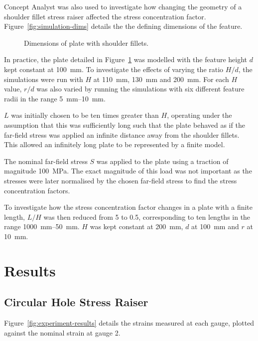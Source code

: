 \documentclass[a4paper,11pt,twocolumn]{article}
\newcommand{\MPa}{\si{\mega\pascal}\xspace}
\newcommand{\mm}{\si{\milli\meter}\xspace}
\begin{document}
Concept Analyst was also used to investigate how changing the geometry of a 
shoulder fillet stress raiser affected the stress concentration factor. 
Figure~\vref{fig:simulation-dims} details the the defining dimensions of the 
feature.

\begin{figure}[h]
    \centering
    \def\svgwidth{\linewidth}
    
    \caption{Dimensions of plate with shoulder fillets.}
    \label{fig:simulation-dims}
\end{figure}

In practice, the plate detailed in Figure~\ref{fig:simulation-dims} was modelled
with the feature height $d$ kept constant at 100~\mm. To investigate the effects
of varying the ratio $H/d$, the simulations were run with $H$ at 110~\mm,
130~\mm and 200~\mm. For each $H$ value, $r/d$ was also varied by running the
simulations with six different feature radii in the range 5~\mm--10~\mm.

$L$ was initially chosen to be ten times greater than $H$, operating under the
assumption that this was sufficiently long such that the plate behaved as if 
the far-field stress was applied an infinite distance away from the shoulder 
fillets. This allowed an infinitely long plate to be represented by a finite
model.

The nominal far-field stress $S$ was applied to the plate using a traction of
magnitude 100~\MPa. The exact magnitude of this load was not important as
the stresses were later normalised by the chosen far-field stress to find the 
stress concentration factors.

To investigate how the stress concentration factor changes in a plate with a
finite length, $L/H$ was then reduced from 5 to 0.5, corresponding to ten 
lengths in the range 1000~\mm--50~\mm. $H$ was kept constant at 200~\mm, $d$ 
at 100~\mm and $r$ at 10~\mm.

\section{Results}

\subsection{Circular Hole Stress Raiser}

Figure~\vref{fig:experiment-results} details the strains measured at each 
gauge, plotted against the nominal strain at gauge 2.
\end{document}
